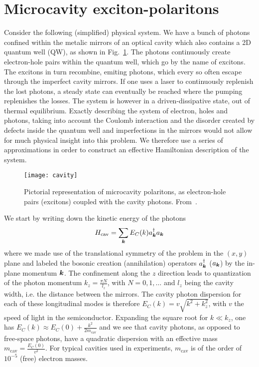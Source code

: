 \section{Microcavity exciton-polaritons}
\label{sec:polaritons}


Consider the following (simplified) physical system. We have a bunch
of photons confined within the metalic mirrors of an optical cavity
which also contains a 2D quantum well (QW), as shown in
Fig.~\ref{fig:cavity-polaritons}. The photons continuously create
electron-hole pairs within the quantum well, which go by the name of
excitons. The excitons in turn recombine, emiting photons, which every
so often escape through the imperfect cavity mirrors. If one uses a
laser to continuously replenish the lost photons, a steady state can
eventually be reached where the pumping replenishes the losses. The
system is however in a driven-dissipative state, out of thermal
equilibrium. Exactly describing the system of electron, holes and
photons, taking into account the Coulomb interaction and the disorder
created by defects inside the quantum well and imperfections in the
mirrors would not allow for much physical insight into this
problem. We therefore use a series of approximations in order to
construct an effective Hamiltonian description of the system.
%
\begin{figure}[tb]\centering
  \texttt{[image: cavity]}
  \caption{
    Pictorial representation of microcavity polaritons, as electron-hole pairs (excitons) coupled with the cavity photons. From~\cite{Kasprzak_2006}.
  }\label{fig:cavity-polaritons}
\end{figure}
% 
We start by writing down the kinetic energy of the photons
%
\begin{equation}\label{eq:cavity-energy}
  H_{\text{cav}} = \sum_{\bm{k}} E_C(k) a_{\bm{k}}^{\dagger} a_{\bm{k}}
\end{equation}
% 
where we made use of the translational symmetry of the problem in the
$(x,y)$ plane and labeled the bosonic creation (annihilation)
operators $a_{\bm{k}}^{\dagger}$ ($a_{\bm{k}}$) by the in-plane momentum
$\bm{k}$. The confinement along the $z$ direction leads to quantization
of the photon momentum $k_z = \frac{\pi N}{l_z}$, with $N = 0,1,\dots$
and $l_z$ being the cavity width, i.e. the distance between the
mirrors. The cavity photon dispersion for each of these longitudinal
modes is therefore $E_C(k) = v \sqrt{k^2 + k_z^2}$, with $v$ the speed
of light in the semiconductor. Expanding the square root for
$k \ll k_z$, one has
$E_C(k) \approx E_C(0) + \frac{k^2}{2m_{\text{cav}}}$ and we see that
cavity photons, as opposed to free-space photons, have a quadratic
dispersion with an effective mass
$m_{\text{cav}} = \frac{E_C(0)}{v^2}$. For typical cavities used in
experiments, $m_{\text{cav}}$ is of the order of $10^{-5}$ (free)
electron masses.

